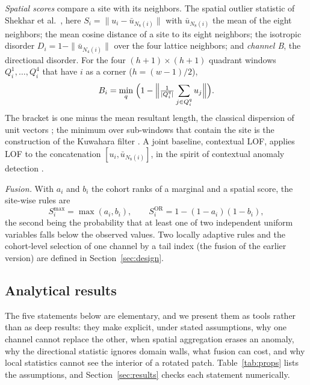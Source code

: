 \emph{Spatial scores} compare a site with its neighbors. The spatial outlier statistic of Shekhar et al.~\citep{Shekhar2003}, here $S_i=\|u_i-\bar u_{N_8(i)}\|$ with $\bar u_{N_8(i)}$ the mean of the eight neighbors; the mean cosine distance of a site to its eight neighbors; the isotropic disorder $D_i=1-\|\bar u_{N_4(i)}\|$ over the four lattice neighbors; and \emph{channel B}, the directional disorder. For the four $(h+1)\times(h+1)$ quadrant windows $Q_i^1,\dots,Q_i^4$ that have $i$ as a corner ($h=(w-1)/2$),
\begin{equation}
B_i=\min_{q}\;\Bigl(1-\Bigl\|\tfrac{1}{|Q_i^q|}\sum_{j\in Q_i^q}u_j\Bigr\|\Bigr).
\label{eq:dir}
\end{equation}
The bracket is one minus the mean resultant length, the classical dispersion of unit vectors \citep{Mardia2000}; the minimum over sub-windows that contain the site is the construction of the Kuwahara filter \citep{Kuwahara1976}. A joint baseline, contextual LOF, applies LOF to the concatenation $[u_i,\bar u_{N_8(i)}]$, in the spirit of contextual anomaly detection \citep{Song2007}.

\emph{Fusion.} With $a_i$ and $b_i$ the cohort ranks of a marginal and a spatial score, the site-wise rules are
\begin{equation}
S_i^{\max}=\max(a_i,b_i),\qquad S_i^{\mathrm{OR}}=1-(1-a_i)(1-b_i),
\label{eq:fusion}
\end{equation}
the second being the probability that at least one of two independent uniform variables falls below the observed values. Two locally adaptive rules and the cohort-level selection of one channel by a tail index (the fusion of the earlier version) are defined in Section~\ref{sec:design}.

\subsection{Analytical results}
The five statements below are elementary, and we present them as tools rather than as deep results: they make explicit, under stated assumptions, why one channel cannot replace the other, when spatial aggregation erases an anomaly, why the directional statistic ignores domain walls, what fusion can cost, and why local statistics cannot see the interior of a rotated patch. Table~\ref{tab:props} lists the assumptions, and Section~\ref{sec:results} checks each statement numerically.

